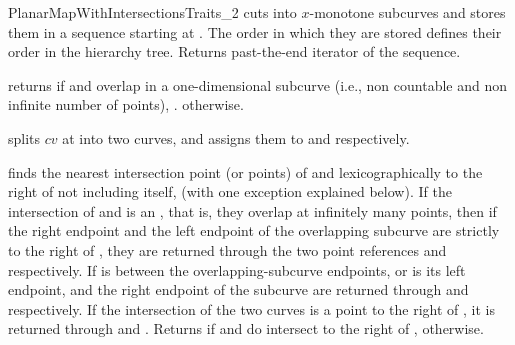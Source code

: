 \begin{ccRefConcept}{PlanarMapWithIntersectionsTraits_2}
	 {cuts  into $x$-monotone subcurves and stores them in a
	 sequence starting at . The order in which they are stored
	 defines their order in the hierarchy tree. Returns past-the-end
	 iterator of the sequence.}

         {returns  if  and  overlap
          in a one-dimensional subcurve (i.e., non countable and non infinite
	  number of points), . otherwise.}


         {splits $cv$ at  into two curves, and assigns them to
            and  respectively.
           }

	 {finds the nearest intersection point (or points) of  and
	    lexicographically to the right of  not including
	    itself, (with one exception explained below).
	   If the intersection of  and  is an
	   , that is, they overlap at infinitely many
	   points, then if the right endpoint and the left endpoint of the
	   overlapping subcurve are strictly to the right of , they are
	   returned through the two point references  and 
	   respectively. If  is between the overlapping-subcurve
	   endpoints, or  is its left endpoint,  and the right
	   endpoint of the subcurve are returned through  and 
	   respectively. If the intersection of the two curves is a point to the
	   right of , it is returned through  and .
	   Returns  if  and  do intersect to the right
	   of ,  otherwise.}


\end{ccRefConcept}
